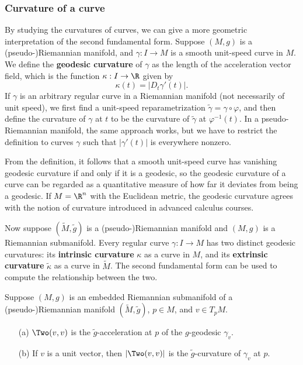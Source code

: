 \subsubsection{Curvature of a curve}
By studying the curvatures of curves, we can give a more geometric interpretation of the second fundamental form. Suppose $(M,g)$ is a (pseudo-)Riemannian manifold, and $\gamma:I\to M$ is a smooth unit-speed curve in $M$. We define the \textbf{geodesic curvature} of $\gamma$ as the length of the acceleration vector field, which is  the function $\kappa:I\to\R$ given by
\[\kappa(t)=|D_t\gamma'(t)|.\]
If $\gamma$ is an arbitrary regular curve in a Riemannian manifold (not necessarily of unit speed), we first find a unit-speed reparametrization $\tilde{\gamma}=\gamma\circ\varphi$, and then define the curvature of $\gamma$ at $t$ to be the curvature of $\tilde{\gamma}$ at $\varphi^{-1}(t)$. In a pseudo-Riemannian manifold, the same approach works, but we have to restrict the definition to curves $\gamma$ such that $|\gamma'(t)|$ is everywhere nonzero.\par
From the definition, it follows that a smooth unit-speed curve has vanishing geodesic curvature if and only if it is a geodesic, so the geodesic curvature of a curve can be regarded as a quantitative measure of how far it deviates from being a geodesic. If $M=\R^n$ with the Euclidean metric, the geodesic curvature agrees with the notion of curvature introduced in advanced calculus courses.\par
Now suppose $(\widetilde{M},\tilde{g})$ is a (pseudo-)Riemannian manifold and $(M,g)$ is a Riemannian submanifold. Every regular curve $\gamma:I\to M$ has two distinct geodesic curvatures: its \textbf{intrinsic curvature} $\kappa$ as a curve in $M$, and its \textbf{extrinsic curvature} $\widetilde{\kappa}$ as a curve 
in $\widetilde{M}$. The second fundamental form can be used to compute the relationship between the two.
\begin{proposition}
Suppose $(M,g)$ is an embedded Riemannian submanifold of a (pseudo-)Riemannian manifold $(\widetilde{M},\tilde{g})$, $p\in M$, and $v\in T_pM$.
\begin{itemize}
\item[(a)] $\Two(v,v)$ is the $\tilde{g}$-acceleration at $p$ of the $g$-geodesic $\gamma_v$.
\item[(b)] If $v$ is a unit vector, then $|\Two(v,v)|$ is the $\tilde{g}$-curvature of $\gamma_v$ at $p$.
\end{itemize}
\end{proposition}
